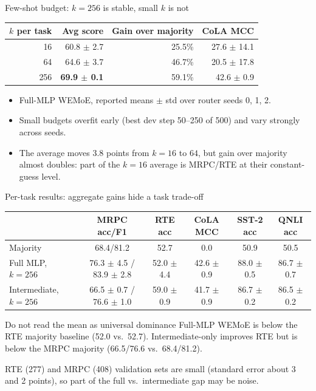 \documentclass[aspectratio=169,10pt]{beamer}
\begin{document}
\begin{frame}{Few-shot budget: $k=256$ is stable, small $k$ is not}
  \centering
  \begin{tabular}{r r r r}
    \toprule
    $k$ per task & Avg score & Gain over majority & CoLA MCC\\
    \midrule
    16 & 60.8 $\pm$ 2.7 & 25.5\% & 27.6 $\pm$ 14.1\\
    64 & 64.6 $\pm$ 3.7 & 46.7\% & 20.5 $\pm$ 17.8\\
    256 & \textbf{69.9 $\pm$ 0.1} & 59.1\% & 42.6 $\pm$ 0.9\\
    \bottomrule
  \end{tabular}
  \vfill
  \begin{itemize}
    \item Full-MLP WEMoE, reported means $\pm$ std over router seeds 0, 1, 2.
    \item Small budgets overfit early (best dev step 50--250 of 500) and vary strongly across seeds.
    \item The average moves 3.8 points from $k=16$ to $64$, but gain over majority almost doubles: part of the $k=16$ average is MRPC/RTE at their constant-guess level.
  \end{itemize}
\end{frame}

\begin{frame}{Per-task results: aggregate gains hide a task trade-off}
  \centering
  \scriptsize
  \begin{tabular}{l c c c c c}
    \toprule
    & MRPC acc/F1 & RTE acc & CoLA MCC & SST-2 acc & QNLI acc\\
    \midrule
    Majority & 68.4/81.2 & 52.7 & 0.0 & 50.9 & 50.5\\
    Full MLP, $k=256$ & 76.3 $\pm$ 4.5 / 83.9 $\pm$ 2.8 & 52.0 $\pm$ 4.4 & 42.6 $\pm$ 0.9 & 88.0 $\pm$ 0.5 & 86.7 $\pm$ 0.7\\
    Intermediate, $k=256$ & 66.5 $\pm$ 0.7 / 76.6 $\pm$ 1.0 & 59.0 $\pm$ 0.9 & 41.7 $\pm$ 0.9 & 86.7 $\pm$ 0.2 & 86.5 $\pm$ 0.2\\
    \bottomrule
  \end{tabular}
  \vfill
  \begin{alertblock}{Do not read the mean as universal dominance}
    Full-MLP WEMoE is below the RTE majority baseline (52.0 vs.\ 52.7). Intermediate-only improves RTE but is below the MRPC majority (66.5/76.6 vs.\ 68.4/81.2).
  \end{alertblock}
  \vspace{-2pt}
  {\scriptsize RTE (277) and MRPC (408) validation sets are small (standard error about 3 and 2 points), so part of the full vs.\ intermediate gap may be noise.}
\end{frame}
\end{document}
